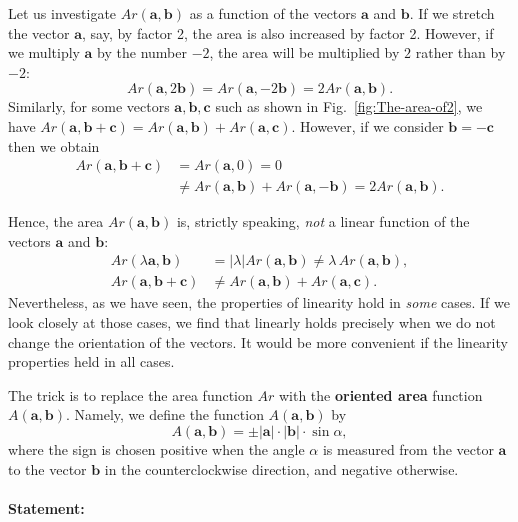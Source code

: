 Let us investigate $Ar(\mathbf{a},\mathbf{b})$ as a function of the
vectors $\mathbf{a}$ and $\mathbf{b}$. If we stretch the vector
$\mathbf{a}$, say, by factor 2, the area is also increased by factor
2. However, if we multiply $\mathbf{a}$ by the number $-2$, the
area will be multiplied by $2$ rather than by $-2$:\[
Ar(\mathbf{a},2\mathbf{b})=Ar(\mathbf{a},-2\mathbf{b})=2Ar(\mathbf{a},\mathbf{b}).\]
 Similarly, for some vectors $\mathbf{a},\mathbf{b},\mathbf{c}$ such
as shown in Fig.~\ref{fig:The-area-of2}, we have $Ar(\mathbf{a},\mathbf{b}+\mathbf{c})=Ar(\mathbf{a},\mathbf{b})+Ar(\mathbf{a},\mathbf{c})$.
However, if we consider $\mathbf{b}=-\mathbf{c}$ then we obtain \begin{align*}
Ar(\mathbf{a},\mathbf{b}+\mathbf{c}) & =Ar(\mathbf{a},0)=0\\
 & \neq Ar(\mathbf{a},\mathbf{b})+Ar(\mathbf{a},-\mathbf{b})=2Ar(\mathbf{a},\mathbf{b}).\end{align*}


Hence, the area $Ar(\mathbf{a},\mathbf{b})$ is, strictly speaking,
\emph{not} a linear function of the vectors $\mathbf{a}$ and $\mathbf{b}$:
\begin{align*}
Ar(\lambda\mathbf{a},\mathbf{b}) & =\left|\lambda\right|Ar(\mathbf{a},\mathbf{b})\neq\lambda\, Ar(\mathbf{a},\mathbf{b}),\\
Ar(\mathbf{a},\mathbf{b}+\mathbf{c}) & \neq Ar(\mathbf{a},\mathbf{b})+Ar(\mathbf{a},\mathbf{c}).\end{align*}
Nevertheless, as we have seen, the properties of linearity hold in
\emph{some} cases. If we look closely at those cases, we find that
linearly holds precisely when we do not change the orientation of
the vectors. It would be more convenient if the linearity properties
held in all cases. 

The trick is to replace the area function $Ar$ with the \textbf{oriented
area} function $A(\mathbf{a},\mathbf{b})$.
Namely, we define the function $A(\mathbf{a},\mathbf{b})$ by \[
A(\mathbf{a},\mathbf{b})=\pm\left|\mathbf{a}\right|\cdot\left|\mathbf{b}\right|\cdot\sin\alpha,\]
where the sign is chosen positive when the angle $\alpha$ is measured
from the vector $\mathbf{a}$ to the vector $\mathbf{b}$ in the counterclockwise
direction, and negative otherwise.


\paragraph{Statement:}

